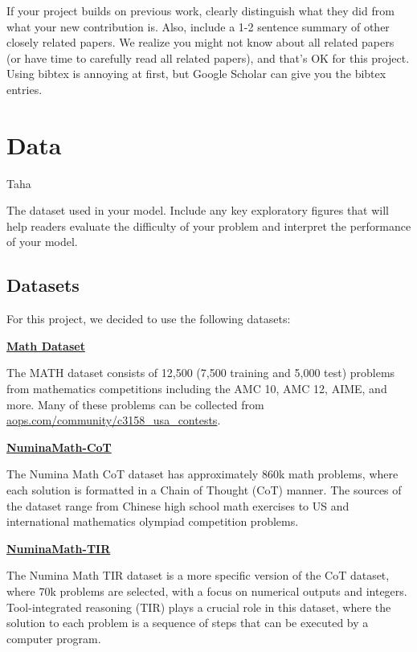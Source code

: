 \documentclass{article}
\begin{document}
If your project builds on previous work, clearly
distinguish what they did from what your new
contribution is. Also, include a 1-2 sentence summary
of other closely related papers. We realize you might
not know about all related papers (or have time to
carefully read all related papers), and that's OK for this
project. Using bibtex is annoying at first, but Google
Scholar can give you the bibtex entries.

\section{Data}
Taha 

The dataset used in your model. Include any key
exploratory figures that will help readers evaluate the
difficulty of your problem and interpret the performance
of your model.

\subsection{Datasets}

For this project, we decided to use the following datasets:

\href{https://www.kaggle.com/datasets/mathurinache/math-dataset}{{\bf Math Dataset}}

The MATH dataset consists of 12,500 (7,500 training and 5,000 test) problems from mathematics competitions including the AMC 10, AMC 12, AIME, and more. Many of these problems can be collected from \href{https://artofproblemsolving.com/community/c3158\_usa\_contests}{aops.com/community/c3158\_usa\_contests}.
\cite{hendrycksmath2021}

\href{https://huggingface.co/datasets/AI-MO/NuminaMath-CoT}{{\bf NuminaMath-CoT}}

The Numina Math CoT dataset has approximately 860k math problems, where each solution is formatted in a Chain of Thought (CoT) manner. The sources of the dataset range from Chinese high school math exercises to US and international mathematics olympiad competition problems.
\cite{numina_math_datasets_CoT}

\href{https://huggingface.co/datasets/AI-MO/NuminaMath-TIR}{{\bf NuminaMath-TIR}}

The Numina Math TIR dataset is a more specific version of the CoT dataset, where 70k problems are selected, with a focus on numerical outputs and integers. Tool-integrated reasoning (TIR) plays a crucial role in this dataset, where the solution to each problem is a sequence of steps that can be executed by a computer program.
\cite{numina_math_datasets_TIR}
\end{document}
